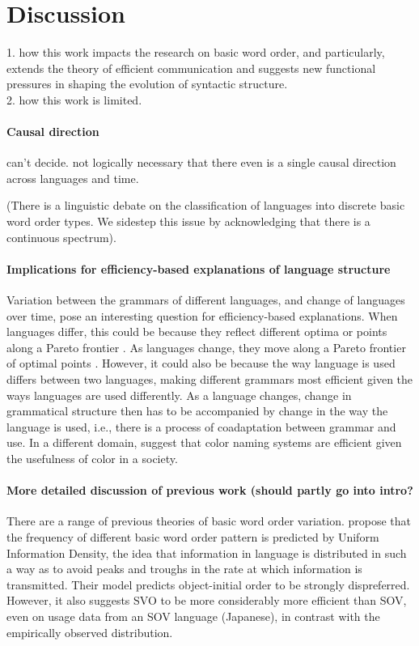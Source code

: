 \documentclass[11pt,a4paper]{article}
\begin{document}
\section{Discussion}

{\color{blue} 1. how this work impacts the research on basic word order, and particularly, extends the theory of efficient communication and suggests new functional pressures in shaping the evolution of syntactic structure.}\\

{\color{blue} 2. how this work is limited.}

\paragraph{Causal direction} can't decide. not logically necessary that there even is a single causal direction across languages and time.


(There is a linguistic debate on the classification of languages into discrete basic word order types. We sidestep this issue by acknowledging that there is a continuous spectrum).


\paragraph{Implications for efficiency-based explanations of language structure}
Variation between the grammars of different languages, and change of languages over time, pose an interesting question for efficiency-based explanations.
When languages differ, this could be because they reflect different optima or points along a Pareto frontier \citep{zaslavsky2018efficient, hahn2020universals}.
As languages change, they move along a Pareto frontier of optimal points \citep{zaslavsky2019evolution}.
However, it could also be because the way language is used differs between two languages, making different grammars most efficient given the ways languages are used differently.
As a language changes, change in grammatical structure then has to be accompanied by change in the way the language is used, i.e., there is a process of {coadaptation} between grammar and use.
In a different domain, \cite{gibson2017color} suggest that color naming systems are efficient given the usefulness of color in a society.

\paragraph{More detailed discussion of previous work (should partly go into intro?}
There are a range of previous theories of basic word order variation.
\cite{maurits2010why} propose that the frequency of different basic word order pattern is predicted by Uniform Information Density, the idea that information in language is distributed in such a way as to avoid peaks and troughs in the rate at which information is transmitted.
Their model predicts object-initial order to be strongly dispreferred.
However, it also suggests SVO to be more considerably more efficient than SOV, even on usage data from an SOV language (Japanese), in contrast with the empirically observed distribution.
\end{document}
